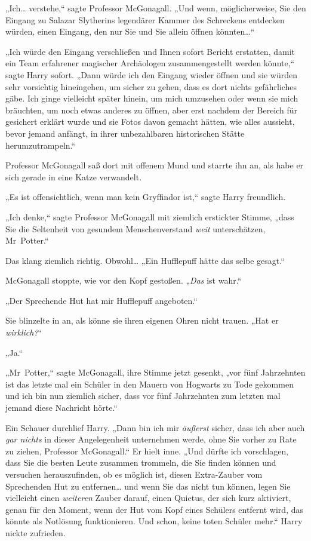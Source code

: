{„Ich… verstehe,“ sagte Professor McGonagall. „Und wenn, möglicherweise, Sie den Eingang zu Salazar Slytherins legendärer Kammer des Schreckens entdecken würden, einen Eingang, den nur Sie und Sie allein öffnen könnten…“

„Ich würde den Eingang verschließen und Ihnen sofort Bericht erstatten, damit ein Team erfahrener magischer Archäologen zusammengestellt werden könnte,“ sagte Harry sofort. „Dann würde ich den Eingang wieder öffnen und sie würden sehr vorsichtig hineingehen, um sicher zu gehen, dass es dort nichts gefährliches gäbe. Ich ginge vielleicht später hinein, um mich umzusehen oder wenn sie mich bräuchten, um noch etwas anderes zu öffnen, aber erst nachdem der Bereich für gesichert erklärt wurde und sie Fotos davon gemacht hätten, wie alles aussieht, bevor jemand anfängt, in ihrer unbezahlbaren historischen Stätte herumzutrampeln.“

Professor McGonagall saß dort mit offenem Mund und starrte ihn an, als habe er sich gerade in eine Katze verwandelt.

„Es ist offensichtlich, wenn man kein Gryffindor ist,“ sagte Harry freundlich.

„Ich denke,“ sagte Professor McGonagall mit ziemlich erstickter Stimme, „dass Sie die Seltenheit von gesundem Menschenverstand \emph{weit} unterschätzen, Mr~Potter.“

Das klang ziemlich richtig. Obwohl… „Ein Hufflepuff hätte das selbe gesagt.“

McGonagall stoppte, wie vor den Kopf gestoßen. „\emph{Das} ist wahr.“

„Der Sprechende Hut hat mir Hufflepuff angeboten.“

Sie blinzelte in an, als könne sie ihren eigenen Ohren nicht trauen. „Hat er \emph{wirklich?}“

„Ja.“

„Mr~Potter,“ sagte McGonagall, ihre Stimme jetzt gesenkt, „vor fünf Jahrzehnten ist das letzte mal ein Schüler in den Mauern von Hogwarts zu Tode gekommen und ich bin nun ziemlich sicher, dass vor fünf Jahrzehnten zum letzten mal jemand diese Nachricht hörte.“

Ein Schauer durchlief Harry. „Dann bin ich mir \emph{äußerst} sicher, dass ich aber auch \emph{gar nichts} in dieser Angelegenheit unternehmen werde, ohne Sie vorher zu Rate zu ziehen, Professor McGonagall.“ Er hielt inne. „Und dürfte ich vorschlagen, dass Sie die besten Leute zusammen trommeln, die Sie finden können und versuchen herauszufinden, ob es möglich ist, diesen Extra-Zauber vom Sprechenden Hut zu entfernen… und wenn Sie das nicht tun können, legen Sie vielleicht einen \emph{weiteren} Zauber darauf, einen Quietus, der sich kurz aktiviert, genau für den Moment, wenn der Hut vom Kopf eines Schülers entfernt wird, das könnte als Notlösung funktionieren. Und schon, keine toten Schüler mehr.“ Harry nickte zufrieden.

}
